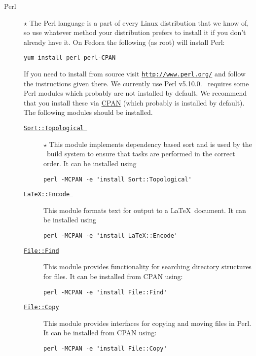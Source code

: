\begin{description}
 \item [Perl] $\star$ The Perl language is a part of every Linux distribution that we know of, so use whatever method your distribution prefers to install it if you don't already have it. On Fedora the following (as root) will install Perl:
\begin{verbatim}
yum install perl perl-CPAN
\end{verbatim}
 If you need to install from source visit \href{http://www.perl.org/}{\tt http://www.perl.org/} and follow the instructions given there. We currently use Perl v5.10.0. \glc\ requires some Perl modules which probably are not installed by default. We recommend that you install these via \href{http://www.cpan.org/}{CPAN} (which probably is installed by default). The following modules should be installed.
 \begin{description}
  \item [\href{http://search.cpan.org/~kstephens/Data-Match-0.06/lib/Sort/Topological.pm}{{\tt Sort::Topological }}] $\star$ This module implements dependency based sort and is used by the \glc\ build system to ensure that tasks are performed in the correct order. It can be installed using
\begin{verbatim}
perl -MCPAN -e 'install Sort::Topological'
\end{verbatim}
  \item [\href{http://search.cpan.org/~andrewf/LaTeX-Encode-0.03/lib/LaTeX/Encode.pm}{{\tt LaTeX::Encode }}] This module formats text for output to a \LaTeX\ document. It can be installed using
\begin{verbatim}
perl -MCPAN -e 'install LaTeX::Encode'
\end{verbatim}
  \item [\href{http://search.cpan.org/~jesse/perl-5.12.1/lib/File/Find.pm}{{\tt File::Find}}] This module provides functionality for searching directory structures for files. It can be installed from CPAN using:
\begin{verbatim}
perl -MCPAN -e 'install File::Find'
\end{verbatim}
  \item [\href{http://search.cpan.org/~jesse/perl-5.12.1/lib/File/Copy.pm}{{\tt File::Copy}}] This module provides interfaces for copying and moving files in Perl. It can be installed from CPAN using:
\begin{verbatim}
perl -MCPAN -e 'install File::Copy'
\end{verbatim}

\end{description}
\end{description}
